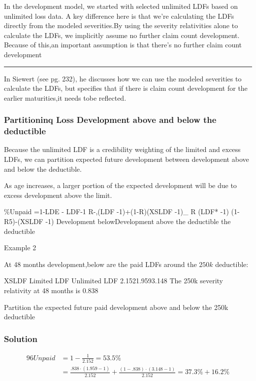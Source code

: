 \documentclass[
]{article}
\begin{document}
In the development model, we started with selected unlimited LDFs based
on unlimited loss data. A key difference here is that we're calculating
the LDFs directly from the modeled severities.By using the severity
relativities alone to calculate the LDFs, we implicitly assume no
further claim count development. Because of this,an important assumption
is that there's no further claim count development

\begin{center}\rule{0.5\linewidth}{0.5pt}\end{center}

In Siewert (see pg. 232), he discusses how we can use the modeled
severities to calculate the LDFs, but specifies that if there is claim
count development for the earlier maturities,it needs tobe reflected.

\subsubsection{Partitioninq Loss Development above and below the
deductible}\label{partitioninq-loss-development-above-and-below-the-deductible}

Because the unlimited LDF is a credibility weighting of the limited and
excess LDFs, we can partition expected future development between
development above and below the deductible.

As age increases, a larger portion of the expected development will be
due to excess development above the limit.

\%Unpaid =1-LDE - LDF-1 R-,(LDF -1)+(1-R)(XSLDF -1)\_ R (LDF* -1) (1-
R5)-(XSLDF -1) Development belowDevelopment above the deductible the
deductible

Example 2

At 48 months development,below are the paid LDFs around the \(250k\)
deductible:

XSLDF Limited LDF Unlimited LDF 2.1521.9593.148 The 250k severity
relativity at 48 months is 0.838

Partition the expected future paid development above and below the 250k
deductible

\subsubsection{Solution}\label{solution-1}

\[
\begin{aligned}
96Unpaid& =1-\frac{1}{2.152}=53.5\% \\
&=\frac{.838\cdot\left(1.959-1\right)}{2.152}+\frac{\left(1-.838\right)\cdot\left(3.148-1\right)}{2.152}=37.3\%+16.2\%
\end{aligned}
\]
\end{document}
